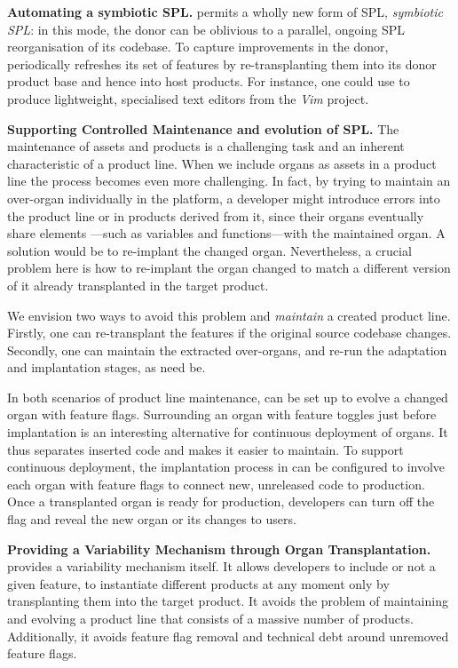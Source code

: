 \textbf{Automating a symbiotic SPL.} \FOUNDRY permits a wholly new form of SPL, \emph{symbiotic SPL}:  in this mode, the donor can be oblivious to a parallel, ongoing SPL reorganisation of its codebase. To capture improvements in the donor, \prodscalpel periodically refreshes its set of features by re-transplanting them into its donor product base and hence into host products. For instance, one could use \prodscalpel to produce lightweight, specialised text editors from the \emph{Vim} project.  

\textbf{Supporting Controlled Maintenance and evolution of SPL.}
The maintenance of assets and products is a challenging task and an inherent characteristic of a product line. When we include organs as assets in a product line the process becomes even more challenging. In fact, by trying to maintain an over-organ individually in the platform, a developer might introduce errors into the product line or in products derived from it, since their organs eventually share elements —such as variables and functions—with the maintained organ. A solution would be to re-implant the changed organ. Nevertheless, a crucial problem here is how to re-implant the organ changed to match a different version of it already transplanted in the target product. 

We envision two ways to avoid this problem and \emph{maintain} a created product line. Firstly, one can re-transplant the features if the original source codebase changes. Secondly, one can maintain the extracted over-organs, and re-run the adaptation and implantation stages, as need be.

In both scenarios of product line maintenance, \FOUNDRY can be set up to evolve a changed organ with feature flags. Surrounding an organ with feature toggles just before implantation is an interesting alternative for continuous deployment of organs. It thus separates inserted code and makes it easier to maintain.
To support continuous deployment, the implantation process in \FOUNDRY can be configured to involve each organ with feature flags to connect new, unreleased code to production. Once a transplanted organ is ready for production, developers can turn off the flag and reveal the new organ or its changes to users.

\textbf{Providing a Variability Mechanism through Organ Transplantation.} 
\FOUNDRY provides a variability mechanism itself. It allows developers to include or not a given feature, to instantiate different products at any moment only by transplanting them into the target product. It avoids the problem of maintaining and evolving a product line that consists of a massive number of products. Additionally,  it avoids feature flag removal and technical debt around unremoved feature flags.

